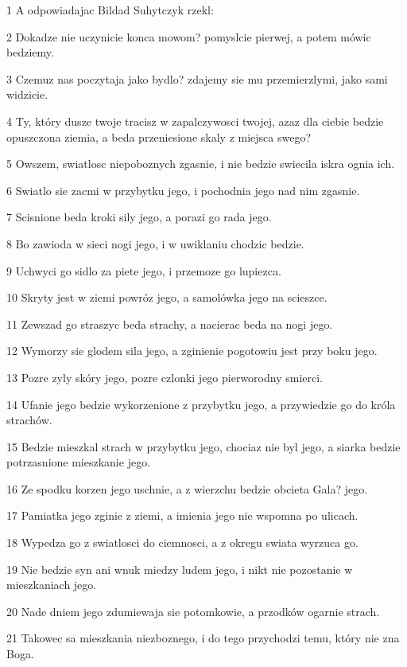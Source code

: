 \par 1 A odpowiadajac Bildad Suhytczyk rzekl:
\par 2 Dokadze nie uczynicie konca mowom? pomyslcie pierwej, a potem mówic bedziemy.
\par 3 Czemuz nas poczytaja jako bydlo? zdajemy sie mu przemierzlymi, jako sami widzicie.
\par 4 Ty, który dusze twoje tracisz w zapalczywosci twojej, azaz dla ciebie bedzie opuszczona ziemia, a beda przeniesione skaly z miejsca swego?
\par 5 Owszem, swiatlosc niepoboznych zgasnie, i nie bedzie swiecila iskra ognia ich.
\par 6 Swiatlo sie zacmi w przybytku jego, i pochodnia jego nad nim zgasnie.
\par 7 Scisnione beda kroki sily jego, a porazi go rada jego.
\par 8 Bo zawioda w sieci nogi jego, i w uwiklaniu chodzic bedzie.
\par 9 Uchwyci go sidlo za piete jego, i przemoze go lupiezca.
\par 10 Skryty jest w ziemi powróz jego, a samolówka jego na scieszce.
\par 11 Zewszad go straszyc beda strachy, a nacierac beda na nogi jego.
\par 12 Wymorzy sie glodem sila jego, a zginienie pogotowiu jest przy boku jego.
\par 13 Pozre zyly skóry jego, pozre czlonki jego pierworodny smierci.
\par 14 Ufanie jego bedzie wykorzenione z przybytku jego, a przywiedzie go do króla strachów.
\par 15 Bedzie mieszkal strach w przybytku jego, chociaz nie byl jego, a siarka bedzie potrzasnione mieszkanie jego.
\par 16 Ze spodku korzen jego uschnie, a z wierzchu bedzie obcieta Gala? jego.
\par 17 Pamiatka jego zginie z ziemi, a imienia jego nie wspomna po ulicach.
\par 18 Wypedza go z swiatlosci do ciemnosci, a z okregu swiata wyrzuca go.
\par 19 Nie bedzie syn ani wnuk miedzy ludem jego, i nikt nie pozostanie w mieszkaniach jego.
\par 20 Nade dniem jego zdumiewaja sie potomkowie, a przodków ogarnie strach.
\par 21 Takowec sa mieszkania niezboznego, i do tego przychodzi temu, który nie zna Boga.

